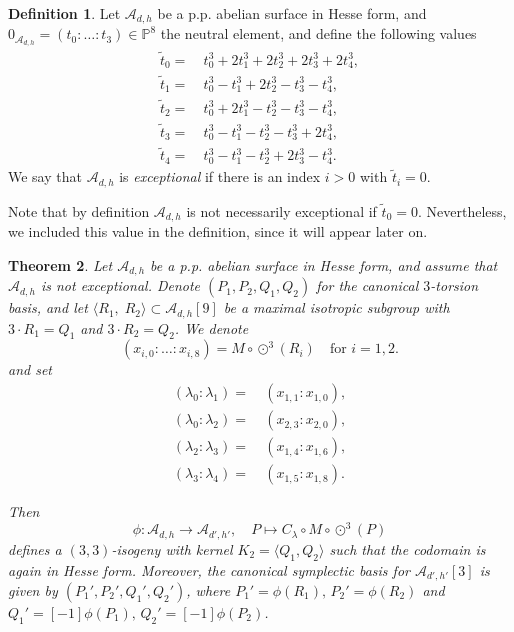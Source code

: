 \documentclass[11pt]{amsart}
\newtheorem{theorem}{Theorem}[section]
\theoremstyle{definition}
\newtheorem{definition}[theorem]{Definition}
\newcommand{\A}{\mathcal{A}}
\newcommand{\PP}{\mathbb{P}}
\newcommand{\cube}{\odot^3}
\begin{document}
\begin{definition}\label{def:exceptional}
    Let $\A_{d,h}$ be a p.p. abelian surface in Hesse form, and $0_{\A_{d,h}} = (t_0: \dots : t_3) \in \PP^8$ the neutral element, and define the following values 
    \begin{align*}
    \tilde{t}_0 =&~ t_0^3 + 2t_1^3 + 2t_2^3 + 2t_3^3 + 2t_4^3,\\
    \tilde{t}_1 =&~  t_0^3 - t_1^3 + 2t_2^3 - t_3^3 -t_4^3,\\
    \tilde{t}_2 = &~ t_0^3 + 2  t_1^3 - t_2^3 - t_3^3 -t_4^3,\\
    \tilde{t}_3 = &~ t_0^3 - t_1^3 - t_2^3 - t_3^3  +2 t_4^3,\\
    \tilde{t}_4 = &~ t_0^3 - t_1^3 - t_2^3 +2 t_3^3 - t_4^3.
    \end{align*}
    We say that $\A_{d,h}$ is {\em exceptional} if there is an index $i>0$ with $\tilde{t}_i = 0$.
\end{definition}
Note that by definition $\A_{d,h}$ is not necessarily exceptional if $\tilde{t}_0 = 0$. Nevertheless, we included this value in the definition, since it will appear later on.

\begin{theorem} \label{thm:3-isogeny-dim2}
    Let $\A_{d,h}$ be a p.p. abelian surface in Hesse form, and assume that $\A_{d,h}$ is not exceptional. Denote $(P_1,P_2,Q_1,Q_2)$ for the canonical $3$-torsion basis, and let 
    \(
    \langle R_1, \; R_2\rangle \subset \A_{d,h}[9]
    \) be a maximal isotropic subgroup with $3 \cdot R_1  =  Q_1$ and $3 \cdot R_2  =  Q_2$. We denote
    \[
    (x_{i,0}:\dots: x_{i,8}) = M \circ \cube(R_i) \quad \text{for } i =1,2.
    \]
    and set 
    \begin{align*}
    (\lambda_0 : \lambda_1) =&~ (x_{1,1} :  x_{1,0}),
    \\
     (\lambda_0 : \lambda_2) =&~ (x_{2,3} :  x_{2,0}),
     \\
    (\lambda_2 : \lambda_3) =&~ (x_{1,4}: x_{1,6}),
    \\ 
    (\lambda_3 : \lambda_4) =&~ (x_{1,5} : x_{1,8}).  
    \end{align*}
    
    Then 
    \[
    \phi: \A_{d,h} \to \A_{d',h'}, \quad P \mapsto C_\lambda \circ M \circ \cube(P)
    \]
    defines a $(3,3)$-isogeny with kernel $K_2 = \langle Q_1, Q_2\rangle$ such that the codomain is again in Hesse form. Moreover, the canonical symplectic basis for $\A_{d',h'}[3]$ is given by  $(P_1',P_2',Q_1',Q_2')$, where $P_1' = \phi(R_1), \, P_2' = \phi(R_2)$ and $Q_1' = [-1]\phi(P_1), \, Q_2' = [-1]\phi(P_2)$. 
\end{theorem}
\end{document}
